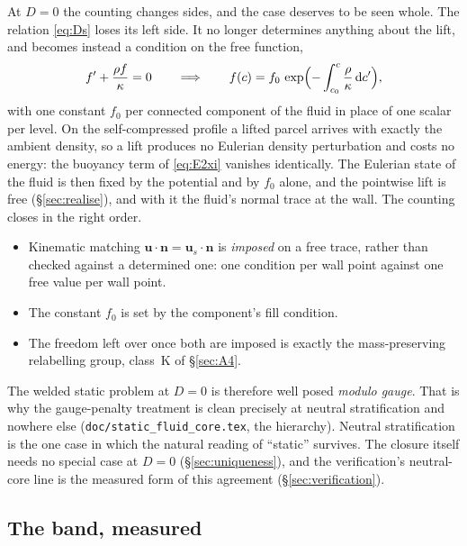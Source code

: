 \documentclass[11pt]{article}
\theoremstyle{definition}
\theoremstyle{remark}
\newcommand{\bu}{\mathbf{u}}
\newcommand{\bn}{\mathbf{n}}
\newcommand{\code}[1]{\texttt{#1}}
\begin{document}
At $D = 0$ the counting changes sides, and the case deserves to be seen
whole. The relation \eqref{eq:Ds} loses its left side. It no longer
determines anything about the lift, and becomes instead a condition on
the free function,
\begin{equation}
  f' + \frac{\rho f}{\kappa} = 0
  \qquad\Longrightarrow\qquad
  f(c) = f_0\,\exp\Bigl(-\int_{c_0}^{c}\frac{\rho}{\kappa}\,\mathrm dc'\Bigr),
  \label{eq:neutral-f}
\end{equation}
with one constant $f_0$ per connected component of the fluid in place
of one scalar per level. On the self-compressed profile a lifted parcel
arrives with exactly the ambient density, so a lift produces no
Eulerian density perturbation and costs no energy: the buoyancy term
of \eqref{eq:E2xi} vanishes identically. The Eulerian state of the
fluid is then fixed by the potential and by $f_0$ alone, and the
pointwise lift is free (\S\ref{sec:realise}), and with it the fluid's
normal trace at the wall. The counting closes in the right order.
\begin{itemize}
\item Kinematic matching $\bu\cdot\bn = \bu_s\cdot\bn$ is
  \emph{imposed} on a free trace, rather than checked against a
  determined one: one condition per wall point against one free value
  per wall point.
\item The constant $f_0$ is set by the component's fill condition.
\item The freedom left over once both are imposed is exactly the
  mass-preserving relabelling group, class~K of \S\ref{sec:A4}.
\end{itemize}
The welded static problem at $D = 0$ is therefore well posed
\emph{modulo gauge}. That is why the gauge-penalty treatment is clean
precisely at neutral stratification and nowhere else
(\code{doc/static\_fluid\_core.tex}, the hierarchy). Neutral
stratification is the one case in which the natural reading of
``static'' survives. The closure itself needs no special case at $D =
0$ (\S\ref{sec:uniqueness}), and the verification's neutral-core line
is the measured form of this agreement (\S\ref{sec:verification}).

\subsection{The band, measured}
\end{document}
